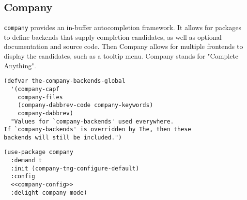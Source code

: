 \documentclass[11pt]{article}
\begin{document}
\subsection{Company}
\label{sec:orge2153e4}
\texttt{company} provides an in-buffer autocompletion framework. It
allows for packages to define backends that supply completion
candidates, as well as optional documentation and source code. Then
Company allows for multiple frontends to display the candidates, such
as a tooltip menu. Company stands for "Complete Anything".

\begin{verbatim}
(defvar the-company-backends-global
  '(company-capf
    company-files
    (company-dabbrev-code company-keywords)
    company-dabbrev)
  "Values for `company-backends' used everywhere.
If `company-backends' is overridden by The, then these
backends will still be included.")
\end{verbatim}

\begin{verbatim}
(use-package company
  :demand t
  :init (company-tng-configure-default)
  :config
  <<company-config>>
  :delight company-mode)
\end{verbatim}
\end{document}
